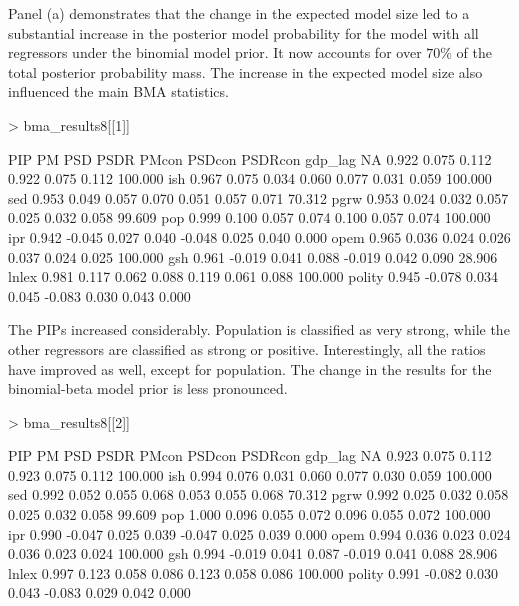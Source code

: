 \documentclass[a4paper]{article}
\begin{document}
Panel (a) demonstrates that the change in the expected model size led to a substantial increase in the posterior model probability for the model with all regressors under the binomial model prior.
It now accounts for over $70\%$ of the total posterior probability mass.
The increase in the expected model size also influenced the main BMA statistics.
\begin{Schunk}
\begin{Sinput}
> bma_results8[[1]]
\end{Sinput}
\begin{Soutput}
          PIP     PM   PSD  PSDR  PMcon PSDcon PSDRcon    %
gdp_lag    NA  0.922 0.075 0.112  0.922  0.075   0.112 100.000
ish     0.967  0.075 0.034 0.060  0.077  0.031   0.059 100.000
sed     0.953  0.049 0.057 0.070  0.051  0.057   0.071  70.312
pgrw    0.953  0.024 0.032 0.057  0.025  0.032   0.058  99.609
pop     0.999  0.100 0.057 0.074  0.100  0.057   0.074 100.000
ipr     0.942 -0.045 0.027 0.040 -0.048  0.025   0.040   0.000
opem    0.965  0.036 0.024 0.026  0.037  0.024   0.025 100.000
gsh     0.961 -0.019 0.041 0.088 -0.019  0.042   0.090  28.906
lnlex   0.981  0.117 0.062 0.088  0.119  0.061   0.088 100.000
polity  0.945 -0.078 0.034 0.045 -0.083  0.030   0.043   0.000
\end{Soutput}
\end{Schunk}
The PIPs increased considerably.
Population is classified as very strong, while the other regressors are classified as strong or positive.
Interestingly, all the ratios have improved as well, except for population.
The change in the results for the binomial-beta model prior is less pronounced.
\begin{Schunk}
\begin{Sinput}
> bma_results8[[2]]
\end{Sinput}
\begin{Soutput}
          PIP     PM   PSD  PSDR  PMcon PSDcon PSDRcon    %
gdp_lag    NA  0.923 0.075 0.112  0.923  0.075   0.112 100.000
ish     0.994  0.076 0.031 0.060  0.077  0.030   0.059 100.000
sed     0.992  0.052 0.055 0.068  0.053  0.055   0.068  70.312
pgrw    0.992  0.025 0.032 0.058  0.025  0.032   0.058  99.609
pop     1.000  0.096 0.055 0.072  0.096  0.055   0.072 100.000
ipr     0.990 -0.047 0.025 0.039 -0.047  0.025   0.039   0.000
opem    0.994  0.036 0.023 0.024  0.036  0.023   0.024 100.000
gsh     0.994 -0.019 0.041 0.087 -0.019  0.041   0.088  28.906
lnlex   0.997  0.123 0.058 0.086  0.123  0.058   0.086 100.000
polity  0.991 -0.082 0.030 0.043 -0.083  0.029   0.042   0.000
\end{Soutput}
\end{Schunk}
\end{document}
